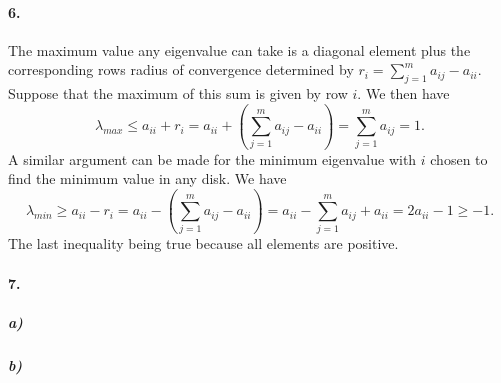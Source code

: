 \documentclass[12pt]{article}
\begin{document}
	
\paragraph{6.}
	The maximum value any eigenvalue can take is a diagonal element plus the corresponding rows radius of convergence determined by $r_i = \sum_{j=1}^{m} a_{ij} - a_{ii}$. Suppose that the maximum of this sum is given by row $i$. We then have
	\[
	\lambda_{max} \le a_{ii} + r_i = a_{ii} + \left( \sum_{j=1}^{m} a_{ij} - a_{ii} \right) = \sum_{j=1}^{m} a_{ij} = 1.
	\]
	A similar argument can be made for the minimum eigenvalue with $i$ chosen to find the minimum value in any disk. We have 
	\[
	\lambda_{min} \ge a_{ii} - r_i = a_{ii} - \left( \sum_{j=1}^{m} a_{ij} - a_{ii} \right)
	= a_{ii} - \sum_{j=1}^{m} a_{ij} + a_{ii} = 2a_{ii} - 1 \ge -1.
	\]
	The last inequality being true because all elements are positive.
	
\paragraph{7.}
	\subparagraph{a)}
		
	
	
	\subparagraph{b)}
	
	
\end{document}
